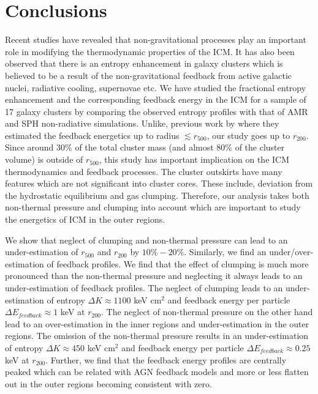 \documentclass[a4paper,fleqn,usenatbib]{mnras}
\begin{document}
\section{Conclusions}
Recent studies have revealed that non-gravitational processes play an important role in  modifying the thermodynamic properties of the ICM. It has also been observed that there is an entropy enhancement in galaxy clusters which is believed to be  a result of the non-gravitational feedback from  active galactic nuclei, radiative cooling, supernovae etc. 
We have studied the fractional entropy enhancement and the corresponding feedback energy in the ICM for a sample of 17 galaxy clusters by comparing the observed entropy profiles with that of AMR and SPH non-radiative simulations. Unlike, previous work by \cite{Chaudhuri2013} where they estimated the feedback energetics up to radius $\lesssim r_{500}$, our study goes up to $r_{200}$. Since around 30\% of the total cluster mass (and almost 80\% of the cluster volume) is outside of $r_{500}$,
this study has important implication on the  ICM thermodynamics and feedback processes. The cluster outskirts have many features which are not significant into cluster cores. These include, deviation from the hydrostatic equilibrium and gas clumping.  Therefore,  our analysis takes both non-thermal pressure and clumping into account which are important to study the energetics of ICM in the outer regions.  

We show that neglect of  clumping and non-thermal pressure can lead to an under-estimation of $r_{500}$ and $r_{200}$ by $10\%-20\%$. Similarly, we find an under/over-estimation of feedback profiles.  We find that the effect of clumping is much more pronounced than the non-thermal pressure and neglecting it always leads to an under-estimation of feedback profiles. The neglect of clumping leads to an under-estimation of entropy $\Delta K\approx 1100$ keV cm$^2$ and feedback energy per particle $\Delta E_{feedback} \approx 1$ keV at $r_{200}$. The neglect of non-thermal pressure on the other hand lead to an over-estimation in the inner regions and under-estimation in the outer regions. The omission of the non-thermal pressure results in an  under-estimation of entropy $\Delta K\approx 450$ keV cm$^2$ and feedback energy per particle $\Delta E_{feedback}\approx 0.25$ keV  at $r_{200}.$
Further, we  find that the feedback energy profiles are centrally peaked which can be related with AGN feedback models and more or less flatten out in the outer regions becoming consistent with zero.  
\end{document}
